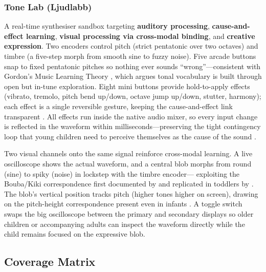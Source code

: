 \documentclass[12pt, a4paper]{article}
\begin{document}
\subsubsection{Tone Lab (Ljudlabb)}
A real-time synthesiser sandbox targeting \textbf{auditory processing},
\textbf{cause-and-effect learning}, \textbf{visual processing via cross-modal
binding}, and \textbf{creative expression}. Two encoders control pitch (strict
pentatonic over two octaves) and timbre (a five-step morph from smooth sine to
fuzzy noise). Five arcade buttons snap to fixed pentatonic pitches so nothing
ever sounds ``wrong''---consistent with Gordon's Music Learning Theory
\citep{gordon2003learning}, which argues tonal vocabulary is built through
open but in-tune exploration. Eight mini buttons provide hold-to-apply
effects (vibrato, tremolo, pitch bend up/down, octave jump up/down, stutter,
harmony); each effect is a single reversible gesture, keeping the
cause-and-effect link transparent \citep{watson1985perception}. All effects
run inside the native audio mixer, so every input change is reflected in the
waveform within milliseconds---preserving the tight contingency loop that
young children need to perceive themselves as the cause of the sound
\citep{rochat2001infant}.

Two visual channels onto the same signal reinforce cross-modal learning. A
live oscilloscope shows the actual waveform, and a central blob morphs from
round (sine) to spiky (noise) in lockstep with the timbre encoder---
exploiting the Bouba/Kiki correspondence first documented by
\citet{kohler1929gestalt} and replicated in toddlers by
\citet{maurer2006shape}. The blob's vertical position tracks pitch (higher
tones higher on screen), drawing on the pitch-height correspondence present
even in infants \citep{dolscheid2014thickness}. A toggle switch swaps the
big oscilloscope between the primary and secondary displays so older
children or accompanying adults can inspect the waveform directly while the
child remains focused on the expressive blob.

\subsection{Coverage Matrix}
\label{sec:coverage}
\end{document}
